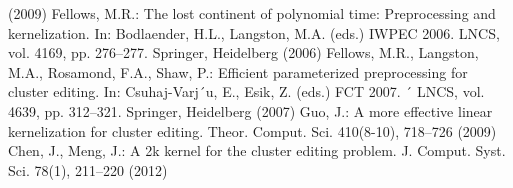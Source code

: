 \documentclass[10.5,a4paper,titlepage]{bxjsarticle}
\begin{document}
\begin{thebibliography}{}
    (2009)
    \bibitem{} Fellows, M.R.: The lost continent of polynomial time: Preprocessing and kernelization. In: Bodlaender, H.L., Langston, M.A. (eds.) IWPEC 2006. LNCS, vol. 4169,
    pp. 276–277. Springer, Heidelberg (2006)
    \bibitem{} Fellows, M.R., Langston, M.A., Rosamond, F.A., Shaw, P.: Efficient parameterized
    preprocessing for cluster editing. In: Csuhaj-Varj´u, E., Esik, Z. (eds.) FCT 2007. ´
    LNCS, vol. 4639, pp. 312–321. Springer, Heidelberg (2007)
    \bibitem{} Guo, J.: A more effective linear kernelization for cluster editing. Theor. Comput.
    Sci. 410(8-10), 718–726 (2009)
    \bibitem{} Chen, J., Meng, J.: A 2k kernel for the cluster editing problem. J. Comput. Syst.
    Sci. 78(1), 211–220 (2012)
\end{thebibliography}
\end{document}
